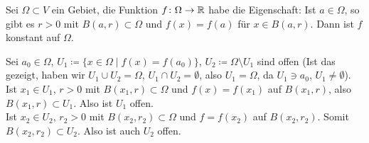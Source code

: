 \begin{lemma}
	Sei $ \Omega\subset V $ ein Gebiet, die Funktion $ f\colon\Omega\rightarrow\mathbb{R} $ habe die Eigenschaft: Ist $ a\in\Omega $, so gibt es $ r>0 $ mit $ B(a,r)\subset\Omega $ und $ f(x)=f(a) $ f\"ur $ x\in B(a,r) $. Dann ist $ f $ konstant auf $ \Omega $.
\end{lemma}
\begin{beweis}
	Sei $ a_0\in\Omega $, $ U_1\coloneqq\lbrace x\in\Omega\mid f(x)=f(a_0)\rbrace $, $ U_2\coloneqq\Omega\setminus U_1 $ sind offen (Ist das gezeigt, haben wir $ U_1\cup U_2=\Omega $, $ U_1\cap U_2=\emptyset $, also $ U_1=\Omega $, da $ U_1\ni a_0 $, $ U_1\neq\emptyset $).\\
	Ist $ x_1\in U_1 $, $ r>0 $ mit $ B(x_1,r)\subset\Omega $ und $ f(x)=f(x_1) $ auf $ B(x_1,r) $, also $ B(x_1,r)\subset U_1 $. Also ist $ U_1 $ offen.\\
	Ist $ x_2\in U_2 $, $ r_2>0 $ mit $ B(x_2, r_2)\subset\Omega $ und $ f=f(x_2) $ auf $ B(x_2,r_2) $. Somit $ B(x_2,r_2)\subset U_2 $. Also ist auch $ U_2 $ offen.
\end{beweis}
